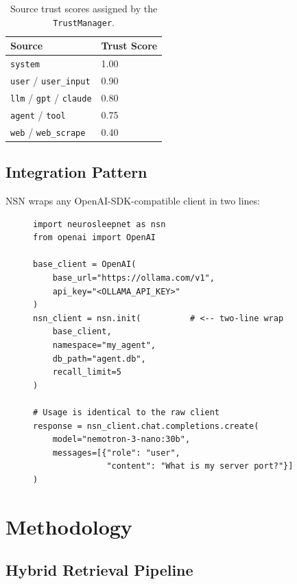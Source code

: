 \documentclass[conference]{IEEEtran}
\begin{document}
\begin{table}[!t]
\caption{Source trust scores assigned by the \texttt{TrustManager}.}
\label{tab:trust}
\centering\scriptsize
\begin{tabular}{@{}ll@{}}
\toprule
\textbf{Source} & \textbf{Trust Score} \\
\midrule
\texttt{system}                               & 1.00 \\
\texttt{user} / \texttt{user\_input}          & 0.90 \\
\texttt{llm} / \texttt{gpt} / \texttt{claude} & 0.80 \\
\texttt{agent} / \texttt{tool}                & 0.75 \\
\texttt{web} / \texttt{web\_scrape}           & 0.40 \\
\bottomrule
\end{tabular}
\end{table}

\subsection{Integration Pattern}
NSN wraps any OpenAI-SDK-compatible client in two lines:

\begin{figure}[!t]
\begin{lstlisting}[caption={NSN initialization (OpenAI-compatible).},
                   label={lst:init}]
import neurosleepnet as nsn
from openai import OpenAI

base_client = OpenAI(
    base_url="https://ollama.com/v1",
    api_key="<OLLAMA_API_KEY>"
)
nsn_client = nsn.init(          # <-- two-line wrap
    base_client,
    namespace="my_agent",
    db_path="agent.db",
    recall_limit=5
)

# Usage is identical to the raw client
response = nsn_client.chat.completions.create(
    model="nemotron-3-nano:30b",
    messages=[{"role": "user",
               "content": "What is my server port?"}]
)
\end{lstlisting}
\end{figure}

\section{Methodology}\label{sec:method}

\subsection{Hybrid Retrieval Pipeline}
\end{document}
